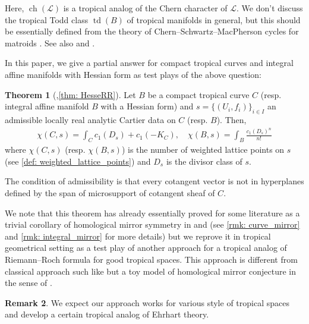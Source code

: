 \documentclass[a4paper,dvipdfmx,reqno,12pt]{amsart}
\theoremstyle{definition}
\newtheorem{Thm}{Theorem}[section]
\newtheorem{Rmk}[Thm]{Remark}
\newcommand{\mcal}[1]{\mathcal{#1}}%
\newcommand{\opn}[1]{\operatorname{#1}}
\numberwithin{equation}{section}
\begin{document}
Here, $\opn{ch}(\mcal{L})$ is a tropical analog of 
the Chern character of $\mcal{L}$.
We don't discuss the tropical Todd class
$\opn{td}(B)$ of tropical manifolds in general, 
but this should be essentially defined from the theory of 
Chern--Schwartz--MacPherson cycles for matroids 
\cite[Previous work]{lopezdemedranoChernSchwartzMacPhersonCyclesMatroids2020}.
See also \cite[5.3]{mikhalkinTropicalGeometryIts2006} and
\cite[Definition 3.20]{shawTropicalSurfaces2015a}.

In this paper, we give a partial answer for compact tropical curves 
and integral affine manifolds with Hessian form
as test plays of the above question:

\begin{Thm}[{,\cref{thm: HesseRR}}] \label{thm: main}
Let $B$ be a compact tropical curve $C$ (resp. integral 
affine manifold $B$
with a Hessian form) and $s=\{(U_i,f_i)\}_{i\in I}$ an admissible 
locally real analytic 
Cartier data on $C$ (resp. $B$). Then,
\begin{align}
\chi(C,s)=\int_C c_1(D_s)+c_1(-K_C), \quad \chi(B,s)=\int_B \frac{c_1(D_s)^{n}}{n!}
\end{align}
where $\chi(C,s)$ (resp. $\chi(B,s)$) is the number of weighted lattice
points on $s$ (see \cref{def: weighted_lattice_points}) and $D_s$ is the divisor class of $s$.
\end{Thm}

The condition of admissibility is that every cotangent vector 
is not in hyperplanes defined by the span of microsupport of
cotangent sheaf of $C$. 


We note that this theorem has already essentially proved for some
literature as a trivial corollary of homological mirror symmetry 
in \cite{MR4301560} and \cite{auroux2022lagrangian} (see \cref{rmk: curve_mirror} and \cref{rmk: integral_mirror} 
for more details) but we reprove it in tropical  
geometrical setting as a test play of another approach 
for a tropical analog of Riemann--Roch formula for 
good tropical spaces. This approach is different
from classical approach such like 
\cite{MR2355607,gathmannRiemannRochTheoremTropical2008a,mikhalkinTropicalCurvesTheir2008a} but
a toy model of homological mirror conjecture in the sense
of \cite[{}]{auroux2022lagrangian}.

\begin{Rmk}
We expect our approach works for various style 
of tropical spaces and develop a certain tropical 
analog of Ehrhart theory. 
\end{Rmk}
\end{document}
